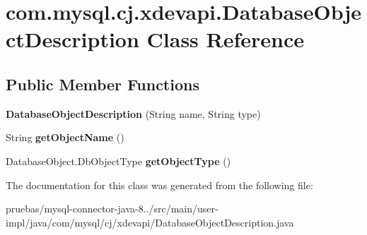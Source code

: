 \hypertarget{classcom_1_1mysql_1_1cj_1_1xdevapi_1_1_database_object_description}{}\section{com.\+mysql.\+cj.\+xdevapi.\+Database\+Object\+Description Class Reference}
\label{classcom_1_1mysql_1_1cj_1_1xdevapi_1_1_database_object_description}
\subsection*{Public Member Functions}
\begin{DoxyCompactItemize}
\item 
\mbox{\label{classcom_1_1mysql_1_1cj_1_1xdevapi_1_1_database_object_description_aad08f685933782dfbd8613e9a75af6d6}} 
{\bfseries Database\+Object\+Description} (String name, String type)
\item 
\mbox{\label{classcom_1_1mysql_1_1cj_1_1xdevapi_1_1_database_object_description_ac076f33b429ce8d5e89b967e8d607055}} 
String {\bfseries get\+Object\+Name} ()
\item 
\mbox{\label{classcom_1_1mysql_1_1cj_1_1xdevapi_1_1_database_object_description_a929c30e6770deecf2d87b6a1464c521e}} 
Database\+Object.\+Db\+Object\+Type {\bfseries get\+Object\+Type} ()
\end{DoxyCompactItemize}


The documentation for this class was generated from the following file\+:\begin{DoxyCompactItemize}
\item 
pruebas/mysql-\/connector-\/java-\/8../src/main/user-\/impl/java/com/mysql/cj/xdevapi/Database\+Object\+Description.\+java\end{DoxyCompactItemize}
